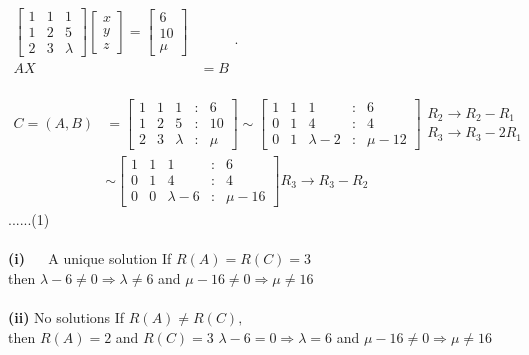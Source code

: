 \begin{enumerate}[label=\color{ocre}\textbf{\arabic*.}]
\begin{answer}
$\begin{aligned}\left[\begin{array}{lll}1 & 1 & 1 \\ 1 & 2 & 5 \\ 2 & 3 & \lambda\end{array}\right]\left[\begin{array}{l}x \\ y \\ z\end{array}\right]=\left[\begin{array}{c}6 \\ 10 \\ \mu\end{array}\right] \\ A X &=B \end{aligned}$.\\\\
$\begin{aligned} C=(A, B) &=\left[\begin{array}{lllll}1 & 1 & 1 & : & 6 \\ 1 & 2 & 5 & : & 10 \\ 2 & 3 & \lambda & : & \mu\end{array}\right] \sim\left[\begin{array}{ccccc}1 & 1 & 1 & : & 6 \\ 0 & 1 & 4 & : & 4 \\ 0 & 1 & \lambda-2 & : & \mu-12\end{array}\right] \begin{array}{l}R_{2} \rightarrow R_{2}-R_{1} \\ R_{3} \rightarrow R_{3}-2 R_{1}\end{array} \\ & \sim\left[\begin{array}{ccccc}1 & 1 & 1 & : & 6 \\ 0 & 1 & 4 & : & 4 \\ 0 & 0 & \lambda-6 & : & \mu-16\end{array}\right] R_{3} \rightarrow R_{3}-R_{2} \end{aligned}$......(1)\\
\\\textbf{(i)} $\quad$ A unique solution If $R(A)=R(C)=3$
\\then $\lambda-6 \neq 0 \Rightarrow \lambda \neq 6$ and $\mu-16 \neq 0 \Rightarrow \mu \neq 16$
\\\\\textbf{(ii)} No solutions If $R(A) \neq R(C),$ \\then $R(A)=2$ and $R(C)=3$ $\lambda-6=0 \Rightarrow \lambda=6$ and $\mu-16 \neq 0 \Rightarrow \mu \neq 16$

\end{answer}
\end{enumerate}
